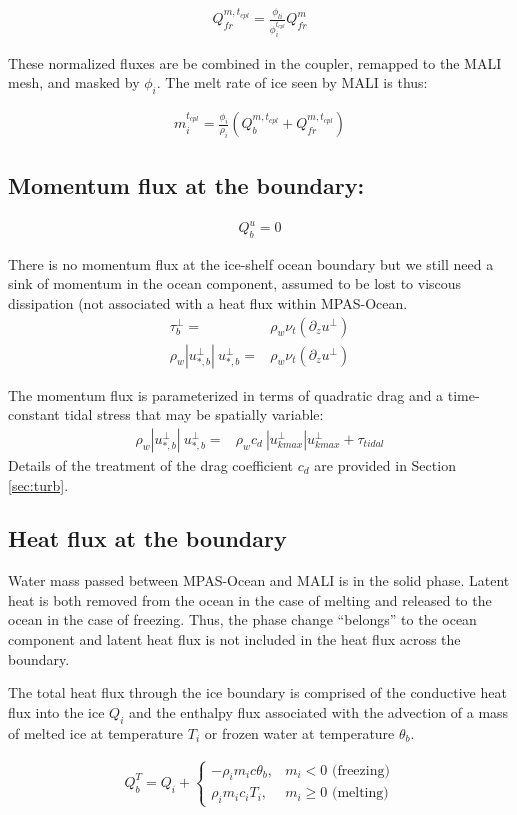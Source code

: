 \documentclass[11pt]{report}
\newcommand{\bea}{\begin{eqnarray}}
\newcommand{\eea}{\end{eqnarray}}
\begin{document}
\bea
    Q_{fr}^{m,t_{cpl}} = \frac{\phi_{li}}{\phi_i^{t_{cpl}}} Q_{fr}^m
\eea


These normalized fluxes are be combined in the coupler, remapped to the MALI mesh, and masked by $\phi_i$.  The melt rate of ice seen by MALI is thus:

\bea
    m_i^{t_{cpl}} = \frac{\phi_i}{\rho_i} \left(Q_b^{m,t_{cpl}} + Q_{fr}^{m,t_{cpl}} \right)
\eea

\subsection{Momentum flux at the boundary:}
\bea
    Q_b^u = 0
\eea

There is no momentum flux at the ice-shelf ocean boundary but we still need a sink of momentum in the ocean component, assumed to be lost to viscous dissipation (not associated with a heat flux within MPAS-Ocean.
\bea
    \tau_b^\perp =& \rho_w \nu_t(\partial_z u^\perp)\\
    \rho_w|u_{*,b}^\perp|\: u_{*,b}^\perp =& \rho_w\nu_t(\partial_z u^\perp)
\eea

The momentum flux is parameterized in terms of quadratic drag and a time-constant tidal stress that may be spatially variable:
\bea
    \rho_w|u_{*,b}^\perp|\: u_{*,b}^\perp =& \rho_w c_d\:|u^\perp_{kmax}|u^\perp_{kmax} + \tau_{tidal}
\eea
Details of the treatment of the drag coefficient $c_d$ are provided in Section \ref{sec:turb}.

\subsection{Heat flux at the boundary}\label{sec:heat_flux}

Water mass passed between MPAS-Ocean and MALI is in the solid phase. Latent heat  is both removed from the ocean in the case of melting and released to the ocean in the case of freezing. Thus, the phase change ``belongs'' to the ocean component and latent heat flux is not included in the heat flux across the boundary.

The total heat flux through the ice boundary is comprised of the conductive heat flux into the ice $Q_i$ and the enthalpy flux associated with the advection of a mass of melted ice at temperature $T_i$ or frozen water at temperature $\theta_b$.

\bea
    Q_b^T = Q_i +
    \begin{cases}
        -\rho_i m_i c \theta_b, &m_i < 0 \text{ (freezing)}\\
        \rho_i m_i c_i T_i, &m_i \ge 0 \text{ (melting)}
    \end{cases}
    \label{eq:heat_flux}
\eea
\end{document}
